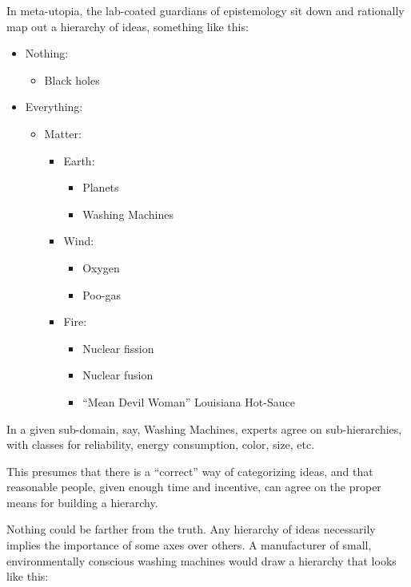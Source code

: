 In meta-utopia, the lab-coated guardians of epistemology sit down
and rationally map out a hierarchy of ideas, something like this:

\begin{itemize}
  \item Nothing:
  \begin{itemize}
    \item Black holes
  \end{itemize}
  \item Everything:
  \begin{itemize}
    \item Matter:
    \begin{itemize}
      \item Earth:
      \begin{itemize}
        \item Planets

        \item Washing Machines
      \end{itemize}
      \item Wind:
      \begin{itemize}
        \item Oxygen

        \item Poo-gas
      \end{itemize}
      \item Fire:
      \begin{itemize}
        \item Nuclear fission

        \item Nuclear fusion

        \item ``Mean Devil Woman'' Louisiana Hot-Sauce
      \end{itemize}
    \end{itemize}
  \end{itemize}
\end{itemize}

In a given sub-domain, say, Washing Machines, experts agree on
sub-hierarchies, with classes for reliability, energy consumption,
color, size, etc.

This presumes that there is a ``correct'' way of categorizing ideas,
and that reasonable people, given enough time and incentive, can
agree on the proper means for building a hierarchy.

Nothing could be farther from the truth. Any hierarchy of ideas
necessarily implies the importance of some axes over others. A
manufacturer of small, environmentally conscious washing machines
would draw a hierarchy that looks like this:

